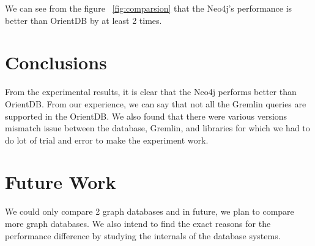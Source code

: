 We can see from the figure ~\ref{fig:comparsion} that the Neo4j's performance is better than OrientDB by at least 2 times.


\section{Conclusions}
From the experimental results, it is clear that the Neo4j performs better than OrientDB. From our experience, we can say that not all the Gremlin queries are supported in the OrientDB. We also found that there were various versions mismatch issue between the database, Gremlin, and libraries for which we had to do lot of trial and error to make the experiment work.

\section{Future Work}
We could only compare 2 graph databases and in future, we plan to compare more graph databases. We also intend to find the exact reasons for the performance difference by studying the internals of the database systems.

